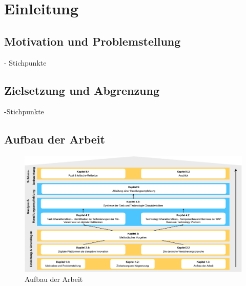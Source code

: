 \chapter{Einleitung}

\section{Motivation und Problemstellung}


- Stichpunkte
\newpage
\section{Zielsetzung und Abgrenzung}

-Stichpunkte

\newpage
\section{Aufbau der Arbeit}

\begin{figure}[h]
    \centering
    \includegraphics[width=1\textwidth]{img/Aufbau_der_Arbeit.jpg}
    \caption[Aufbau der Arbeit]{Aufbau der Arbeit\autocite{Aufbau}}
    \label{fig:Aufbau}
\end{figure}

\newpage